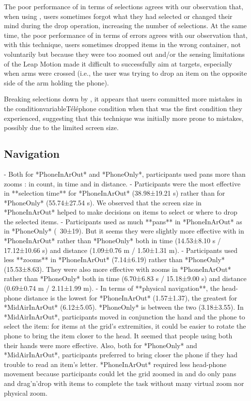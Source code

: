 The poor performance of  in terms of selections agrees with our observation that, when using , users sometimes forgot what they had selected or changed their mind during the drop operation, increasing the number of selections. At the same time, the poor performance of  in terms of errors agrees with our observation that, with this technique, users sometimes dropped items in the wrong container, not voluntarily but because they were too zoomed out and/or the sensing limitations of the Leap Motion made it difficult to successfully aim at targets, especially when arms were crossed (i.e., the user was trying to drop an item on the opposite side of the arm holding the phone).

Breaking selections down by  , it appears that users committed more mistakes in the conditionvariable{Téléphone} condition when that was the first condition they experienced, suggesting that this technique was initially more prone to mistakes, possibly due to the limited screen size.


\subsection{Navigation}
\label{subsec:experiment_results_navigation}
- Both for *PhoneInArOut* and *PhoneOnly*, participants used pans more than zooms : in count, in time and in distance.
- Participants were the most effective in **selection time** for *PhoneInArOut* (38.98±19.21 s) rather than for *PhoneOnly* (55.74±27.54 s). We observed that the screen size in *PhoneInArOut* helped to make decisions on items to select or where to drop the selected items.
- Participants used as much **pans** in *PhoneInArOut* as in *PhoneOnly* (~30±19). But it seems they were slightly more effective with in *PhoneInArOut* rather than *PhoneOnly* both in time (14.53±8.10 s / 17.12±10.66 s) and distance (1.09±0.76 m / 1.50±1.31 m). 
- Participants used less **zooms** in *PhoneInArOut* (7.14±6.19) rather than *PhoneOnly* (15.53±8.63). They were also more effective with zooms in *PhoneInArOut* rather than *PhoneOnly* both in time (6.70±6.83 s / 15.18±9.00 s) and distance (0.69±0.74 m / 2.11±1.99 m).
- In terms of **physical navigation**, the head-phone distance is the lowest for *PhoneInArOut* (1.57±1.37), the greatest for *MidAirInArOut* (6.12±5.05). *PhoneOnly* is between the two (3.18±3.55). In *MidAirInArOut*, participants moved in conjunction the hand and the phone to select the item: for items at the grid's extremities, it could be easier to rotate the phone to bring the item closer to the head. It seemed that people using both their hands were more effective. Also, both for *PhoneOnly* and *MidAirInArOut*, participants preferred to bring closer the phone if they had trouble to read an item's letter. *PhoneInArOut* required less head-phone movement because participants could let the grid zoomed in and do only pans and drag'n'drop with items to complete the task without many virtual zoom nor physical zoom.


